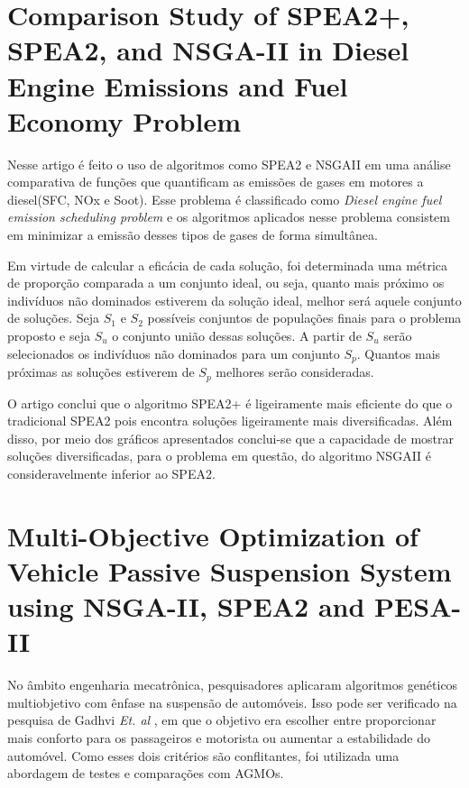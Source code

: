 \documentclass[12pt, %
openright, 
oneside, %
a4paper,    %
brazil]{facom-ufu-abntex2}
\begin{document}
    \section{Comparison Study of SPEA2+, SPEA2, and NSGA-II in Diesel Engine Emissions and Fuel Economy Problem}
    
    Nesse artigo\cite{SPEA2ComparisonNSGAII} é feito o uso de algoritmos como SPEA2 e NSGAII em uma análise comparativa de funções que quantificam as emissões de gases em motores a diesel(SFC, NOx e Soot). Esse problema é classificado como \textit{Diesel engine fuel emission scheduling problem} e os algoritmos aplicados nesse problema consistem em minimizar a emissão desses tipos de gases de forma simultânea.
    
   Em virtude de calcular a eficácia de cada solução, foi determinada uma métrica de proporção comparada a um conjunto ideal, ou seja, quanto mais próximo os indivíduos não dominados estiverem da solução ideal, melhor será aquele conjunto de soluções. Seja $S_1$ e $S_2$ possíveis conjuntos de populações finais para o problema proposto e seja $S_u$ o conjunto união dessas soluções. A partir de $S_u$ serão selecionados os indivíduos não dominados para um conjunto $S_p$. Quantos mais próximas as soluções estiverem de $S_p$ melhores serão consideradas.
    
   	O artigo conclui que o algoritmo SPEA2+ \cite{SPEA2+} é ligeiramente mais eficiente do que o tradicional SPEA2 pois encontra soluções ligeiramente mais diversificadas. Além disso, por meio dos gráficos apresentados conclui-se que a capacidade de mostrar soluções diversificadas, para o problema em questão, do algoritmo NSGAII é consideravelmente inferior ao SPEA2.
   
    \section{Multi-Objective Optimization of Vehicle Passive Suspension
    	System using NSGA-II, SPEA2 and PESA-II}
    	
   	No âmbito engenharia mecatrônica, pesquisadores aplicaram algoritmos genéticos multiobjetivo com ênfase na suspensão de automóveis. Isso  pode ser verificado na pesquisa de Gadhvi \textit{Et. al} \cite{suspensionCar}, em que o objetivo era escolher entre proporcionar mais conforto para os passageiros e motorista ou aumentar a estabilidade do automóvel. Como esses dois critérios são conflitantes, foi utilizada uma abordagem de testes e comparações com AGMOs.
   	
\end{document}
